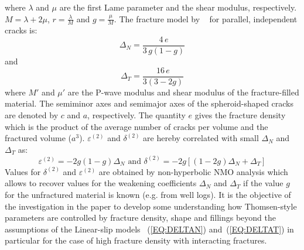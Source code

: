 \documentclass[review,authoryear]{elsarticle}
\begin{document}
where $\lambda$ and $\mu$ are the first Lame parameter and the shear modulus, respectively. $M = \lambda + 2\mu$, $r = \frac{\lambda}{M}$ and $g = \frac{\mu}{M}$. The fracture model by ~\cite{bakulin2000estimation} for parallel, independent cracks is:
\begin{equation} \label{EQ:DELTAN}
  \Delta_N = \frac{4\,e}{3\, g(1-g)}
  \end{equation}
and 
\begin{equation} \label{EQ:DELTAT}
\Delta_T = \frac{16\, e}{3(3-2g)
}
\end{equation}
where $M'$ and $\mu'$ are the P-wave modulus and shear modulus of the fracture-filled material. The semiminor axes and  semimajor axes of the spheroid-shaped cracks are denoted by $c$ and $a$, respectively. The quantity $e$ gives the fracture density which is the product of the average number of cracks per volume and the fractured volume ($a^3$).
$\varepsilon^{(2)}$ and $\delta^{(2)}$ are hereby correlated with small $\Delta_N$ and $\Delta_T$ as:
\begin{equation}\label{EQ:THOMSEN-4}
  \varepsilon^{(2)} = -2g(1-g)\Delta_N \mbox{ and }   \delta^{(2)} = -2g[(1-2g)\Delta_N+\Delta_T]
\end{equation}
Values for $\delta^{(2)}$ and $\varepsilon^{(2)}$ are obtained by non-hyperbolic NMO analysis which allows to recover values for the 
weakening coefficients $\Delta_N$ and $\Delta_T$ if the value $g$ for the unfractured material is known (e.g. from well logs).   
It is the objective of the investigation in the paper to develop some understanding how Thomsen-style parameters are controlled by fracture density, shape and fillings beyond the assumptions of the Linear-slip models ~(\ref{EQ:DELTAN}) and~(\ref{EQ:DELTAT}) in particular 
for the case of high fracture density with interacting fractures.   
\end{document}
